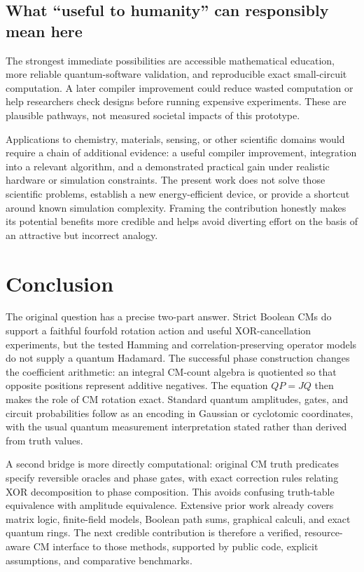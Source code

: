 \subsection{What ``useful to humanity'' can responsibly mean here}
The strongest immediate possibilities are accessible mathematical education, more reliable quantum-software validation, and reproducible exact small-circuit computation. A later compiler improvement could reduce wasted computation or help researchers check designs before running expensive experiments. These are plausible pathways, not measured societal impacts of this prototype.

Applications to chemistry, materials, sensing, or other scientific domains would require a chain of additional evidence: a useful compiler improvement, integration into a relevant algorithm, and a demonstrated practical gain under realistic hardware or simulation constraints. The present work does not solve those scientific problems, establish a new energy-efficient device, or provide a shortcut around known simulation complexity. Framing the contribution honestly makes its potential benefits more credible and helps avoid diverting effort on the basis of an attractive but incorrect analogy.

\section{Conclusion}
The original question has a precise two-part answer. Strict Boolean CMs do support a faithful fourfold rotation action and useful XOR-cancellation experiments, but the tested Hamming and correlation-preserving operator models do not supply a quantum Hadamard. The successful phase construction changes the coefficient arithmetic: an integral CM-count algebra is quotiented so that opposite positions represent additive negatives. The equation $QP=JQ$ then makes the role of CM rotation exact. Standard quantum amplitudes, gates, and circuit probabilities follow as an encoding in Gaussian or cyclotomic coordinates, with the usual quantum measurement interpretation stated rather than derived from truth values.

A second bridge is more directly computational: original CM truth predicates specify reversible oracles and phase gates, with exact correction rules relating XOR decomposition to phase composition. This avoids confusing truth-table equivalence with amplitude equivalence. Extensive prior work already covers matrix logic, finite-field models, Boolean path sums, graphical calculi, and exact quantum rings. The next credible contribution is therefore a verified, resource-aware CM interface to those methods, supported by public code, explicit assumptions, and comparative benchmarks.

